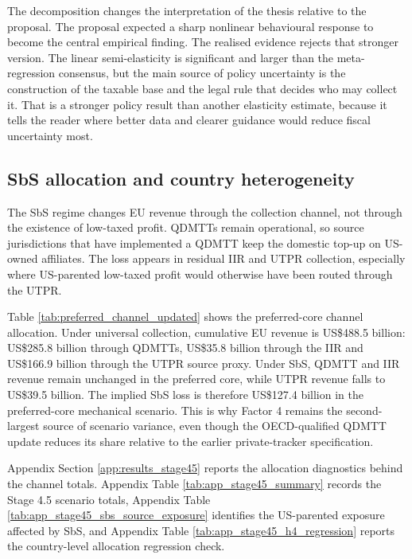 \documentclass[11pt,a4paper]{article}
\begin{document}
The decomposition changes the interpretation of the thesis relative to the proposal. The proposal expected a sharp nonlinear behavioural response to become the central empirical finding. The realised evidence rejects that stronger version. The linear semi-elasticity is significant and larger than the meta-regression consensus, but the main source of policy uncertainty is the construction of the taxable base and the legal rule that decides who may collect it. That is a stronger policy result than another elasticity estimate, because it tells the reader where better data and clearer guidance would reduce fiscal uncertainty most.


\subsection{SbS allocation and country heterogeneity}\label{sec:results_sbs}

The SbS regime changes EU revenue through the collection channel, not through the existence of low-taxed profit. QDMTTs remain operational, so source jurisdictions that have implemented a QDMTT keep the domestic top-up on US-owned affiliates. The loss appears in residual IIR and UTPR collection, especially where US-parented low-taxed profit would otherwise have been routed through the UTPR.



Table \ref{tab:preferred_channel_updated} shows the preferred-core channel allocation. Under universal collection, cumulative EU revenue is US\$488.5 billion: US\$285.8 billion through QDMTTs, US\$35.8 billion through the IIR and US\$166.9 billion through the UTPR source proxy. Under SbS, QDMTT and IIR revenue remain unchanged in the preferred core, while UTPR revenue falls to US\$39.5 billion. The implied SbS loss is therefore US\$127.4 billion in the preferred-core mechanical scenario. This is why Factor 4 remains the second-largest source of scenario variance, even though the OECD-qualified QDMTT update reduces its share relative to the earlier private-tracker specification.

Appendix Section \ref{app:results_stage45} reports the allocation diagnostics behind the channel totals. Appendix Table \ref{tab:app_stage45_summary} records the Stage 4.5 scenario totals, Appendix Table \ref{tab:app_stage45_sbs_source_exposure} identifies the US-parented exposure affected by SbS, and Appendix Table \ref{tab:app_stage45_h4_regression} reports the country-level allocation regression check.
\end{document}
